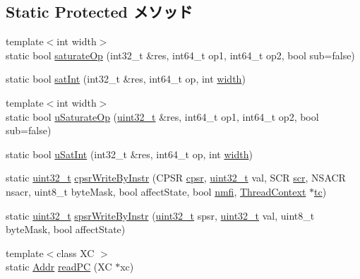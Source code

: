\subsection*{Static Protected メソッド}
\begin{DoxyCompactItemize}
\item 
{\footnotesize template$<$int width$>$ }\\static bool \hyperlink{classArmISA_1_1ArmStaticInst_ac89dee160ae86de9876da96a1df9ca67}{saturateOp} (int32\_\-t \&res, int64\_\-t op1, int64\_\-t op2, bool sub=false)
\item 
static bool \hyperlink{classArmISA_1_1ArmStaticInst_acd2842ccffb92bb276c016c87155bc67}{satInt} (int32\_\-t \&res, int64\_\-t op, int \hyperlink{namespaceArmISA_a0da89c280130b84ae26405a901396428}{width})
\item 
{\footnotesize template$<$int width$>$ }\\static bool \hyperlink{classArmISA_1_1ArmStaticInst_a588c48bae73d27c932022c7738612e28}{uSaturateOp} (\hyperlink{Type_8hh_a435d1572bf3f880d55459d9805097f62}{uint32\_\-t} \&res, int64\_\-t op1, int64\_\-t op2, bool sub=false)
\item 
static bool \hyperlink{classArmISA_1_1ArmStaticInst_a1836673d51155a1d5792744da88eb51b}{uSatInt} (int32\_\-t \&res, int64\_\-t op, int \hyperlink{namespaceArmISA_a0da89c280130b84ae26405a901396428}{width})
\item 
static \hyperlink{Type_8hh_a435d1572bf3f880d55459d9805097f62}{uint32\_\-t} \hyperlink{classArmISA_1_1ArmStaticInst_a26cbe697c83efb76534cf501020a9e8c}{cpsrWriteByInstr} (CPSR \hyperlink{namespaceArmISA_ad377bf9b9c48f8cf3e8e918e0847b1fe}{cpsr}, \hyperlink{Type_8hh_a435d1572bf3f880d55459d9805097f62}{uint32\_\-t} val, SCR \hyperlink{namespaceArmISA_ace0bf26677706ecff809bd4c76d33c8c}{scr}, NSACR nsacr, uint8\_\-t byteMask, bool affectState, bool \hyperlink{namespaceArmISA_a5c0063e75cc368c01fa3a96930b13593}{nmfi}, \hyperlink{classThreadContext}{ThreadContext} $\ast$\hyperlink{namespaceArmISA_a5aff829af55e65b802d83dfcef4e9dd0}{tc})
\item 
static \hyperlink{Type_8hh_a435d1572bf3f880d55459d9805097f62}{uint32\_\-t} \hyperlink{classArmISA_1_1ArmStaticInst_a2fd5209011bb73f8cccbb7c3ff60a553}{spsrWriteByInstr} (\hyperlink{Type_8hh_a435d1572bf3f880d55459d9805097f62}{uint32\_\-t} spsr, \hyperlink{Type_8hh_a435d1572bf3f880d55459d9805097f62}{uint32\_\-t} val, uint8\_\-t byteMask, bool affectState)
\item 
{\footnotesize template$<$class XC $>$ }\\static \hyperlink{classm5_1_1params_1_1Addr}{Addr} \hyperlink{classArmISA_1_1ArmStaticInst_a8895f5e6ea72acdc881a4a2811d8061d}{readPC} (XC $\ast$xc)

\end{DoxyCompactItemize}
